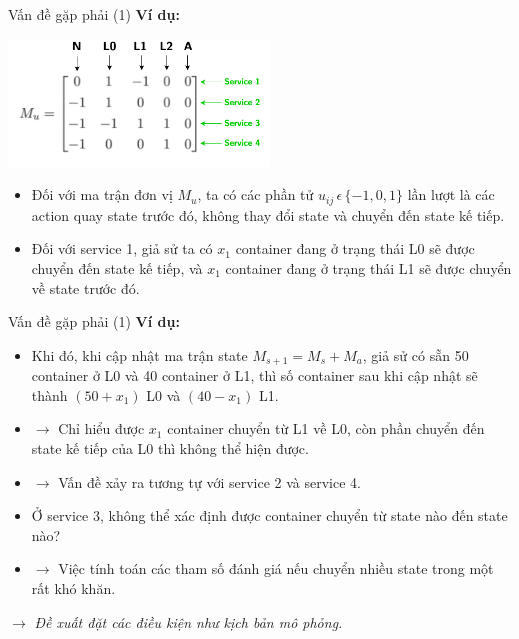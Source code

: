 \documentclass[10pt,aspectratio=169]{beamer}
\begin{document}
\begin{frame}{Vấn đề gặp phải (1)}{\subsecname}
\textbf{Ví dụ:}
\begin{center}
\includegraphics[width=0.52\textwidth]{source/6.png}
\end{center}
\scriptsize
\begin{itemize}
\setlength\itemsep{8pt}
\item Đối với ma trận đơn vị $ M_u $, ta có các phần tử $ u_{ij}\,\epsilon\,\{ -1, 0, 1\}$ lần lượt là các action quay state trước đó, không thay đổi state và chuyển đến state kế tiếp.
\item Đối với service 1, giả sử ta có $ x_1 $ container đang ở trạng thái L0 sẽ được chuyển đến state kế tiếp, và $ x_1 $ container đang ở trạng thái L1 sẽ được chuyển về state trước đó.
\end{itemize}
\end{frame}

\begin{frame}{Vấn đề gặp phải (1)}{\subsecname}
\textbf{Ví dụ:}
\small
\begin{itemize}
\setlength\itemsep{8pt}
\item Khi đó, khi cập nhật ma trận state $ M_{s+1} = M_s + M_a $, giả sử có sẵn 50 container ở L0 và 40 container ở L1, thì số container sau khi cập nhật sẽ thành $ (50 + x_1) $ L0 và $ (40 - x_1) $ L1.
\item[] $ \rightarrow $ Chỉ hiểu được $ x_1 $ container chuyển từ L1 về L0, còn phần chuyển đến state kế tiếp của L0 thì không thể hiện được.
\item[] $ \rightarrow $ Vấn đề xảy ra tương tự với service 2 và service 4.
\item Ở service 3, không thể xác định được container chuyển từ state nào đến state nào?
\item[] $ \rightarrow $ Việc tính toán các tham số đánh giá nếu chuyển nhiều state trong một  rất khó khăn.
\end{itemize}
\normalsize
$ \longrightarrow $ \textit{Đề xuất đặt các điều kiện như kịch bản mô phỏng.}
\end{frame}
\end{document}
